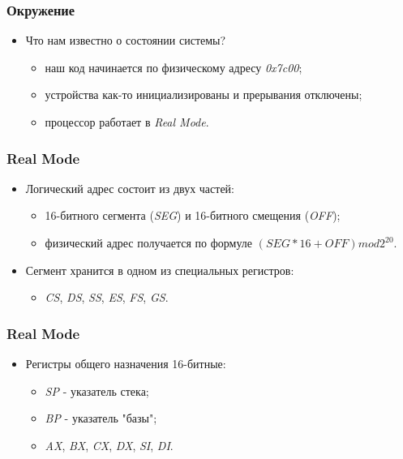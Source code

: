 \begin{frame}
\frametitle{Окружение}
\begin{itemize}
    \item<1->Что нам известно о состоянии системы?
    \begin{itemize}
        \item<2->наш код начинается по физическому адресу \emph{0x7c00};
        \item<3->устройства как-то инициализированы и прерывания отключены;
        \item<4->процессор работает в \emph{Real Mode}.
    \end{itemize}
\end{itemize}
\end{frame}

\begin{frame}
\frametitle{Real Mode}
\begin{itemize}
    \item<1->Логический адрес состоит из двух частей:
    \begin{itemize}
        \item<1->16-битного сегмента (\emph{SEG}) и 16-битного смещения
        (\emph{OFF});
        \item<2->физический адрес получается по формуле
        $\left(SEG * 16 + OFF\right) mod 2^{20}$.
    \end{itemize}
    \item<3->Сегмент хранится в одном из специальных регистров:
    \begin{itemize}
        \item \emph{CS}, \emph{DS}, \emph{SS}, \emph{ES}, \emph{FS}, \emph{GS}.
    \end{itemize}
\end{itemize}
\end{frame}

\begin{frame}
\frametitle{Real Mode}
\begin{itemize}
    \item<1->Регистры общего назначения 16-битные:
    \begin{itemize}
        \item \emph{SP} - указатель стека;
        \item \emph{BP} - указатель "базы";
        \item \emph{AX}, \emph{BX}, \emph{CX}, \emph{DX}, \emph{SI}, \emph{DI}.
    \end{itemize}
\end{itemize}
\end{frame}

